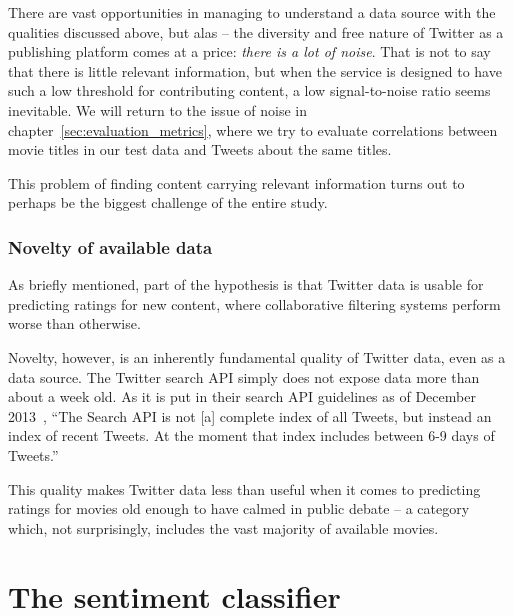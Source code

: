 There are vast opportunities in managing to understand a data source with the qualities discussed above, but alas -- the diversity and free nature of Twitter as a publishing platform comes at a price: \emph{there is a lot of noise}.
That is not to say that there is little relevant information, but when the service is designed to have such a low threshold for contributing content, a low signal-to-noise ratio seems inevitable.
We will return to the issue of noise in chapter~\ref{sec:evaluation_metrics}, where we try to evaluate correlations between movie titles in our test data and Tweets about the same titles.

This problem of finding content carrying relevant information turns out to perhaps be the biggest challenge of the entire study.

\subsubsection{Novelty of available data} %
\label{sub:novelty_of_available_data}

As briefly mentioned, part of the hypothesis is that Twitter data is usable for predicting ratings for new content, where collaborative filtering systems perform worse than otherwise.

Novelty, however, is an inherently fundamental quality of Twitter data, even as a data source.
The Twitter search API simply does not expose data more than about a week old.
As it is put in their search API guidelines as of December 2013~\cite{UsingTwitterSearchAPI}, ``The Search API is not [a] complete index of all Tweets, but instead an index of recent Tweets. At the moment that index includes between 6-9 days of Tweets.''

This quality makes Twitter data less than useful when it comes to predicting ratings for movies old enough to have calmed in public debate -- a category which, not surprisingly, includes the vast majority of available movies.




\section{The sentiment classifier} %
\label{sec:the_sentiment_classifier}

